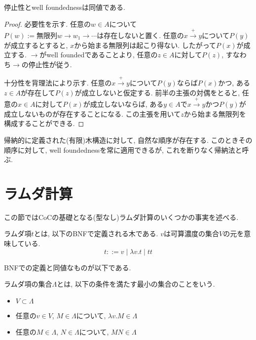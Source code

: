 \documentclass[12pt, titlepage]{ltjsarticle}
\begin{document}
\begin{thm}
 停止性とwell foundednessは同値である.
\end{thm}

\begin{proof}
 必要性を示す. 任意の$w \in A$について$P(w):= \text{無限列} w \rightarrow w_1 \rightarrow \cdots \text{は存在しない}$と置く. 任意の$x \xrightarrow{+} y$について$P(y)$が成立するとすると, $x$から始まる無限列は起こり得ない. したがって$P(x)$が成立する. $\rightarrow$がwell foundedであることより, 任意の$z \in A$に対して$P(z)$, すなわち$\rightarrow$の停止性が従う.

 十分性を背理法により示す. 任意の$x \xrightarrow{+} y$について$P(y)$ならば$P(x)$かつ, ある$z \in A$が存在して$P(z)$が成立しないと仮定する. 前半の主張の対偶をとると, 任意の$x \in A$に対して$P(x)$が成立しないならば, ある$y \in A$で$x \xrightarrow{+} y$かつ$P(y)$が成立しないものが存在することになる. この主張を用いて$z$から始まる無限列を構成することができる.
\end{proof}

\begin{rem}
帰納的に定義された(有限)木構造に対して, 自然な順序が存在する.
このときその順序に対して, well foundednessを常に適用できるが, これを断りなく帰納法と呼ぶ.
\end{rem}


\section{ラムダ計算}\label{lambda}
この節ではCoCの基礎となる(型なし)ラムダ計算のいくつかの事実を述べる.

\begin{defn}
 ラムダ項$t$とは, 以下のBNFで定義される木である. $v$は可算濃度の集合$V$の元を意味している.
 \[
 t ::= v \mid \lambda v. t \mid t t
 \]
\end{defn}

BNFでの定義と同値なものが以下である.

\begin{defn}
 ラムダ項の集合$\Lambda$とは, 以下の条件を満たす最小の集合のことをいう.
 \begin{itemize}
  \item $V \subset \Lambda$
  \item 任意の$v \in V$, $M \in \Lambda$について, $\lambda v. M \in \Lambda$
  \item 任意の$M \in \Lambda$, $N \in \Lambda$について, $M N \in \Lambda$
 \end{itemize}
\end{defn}
\end{document}
